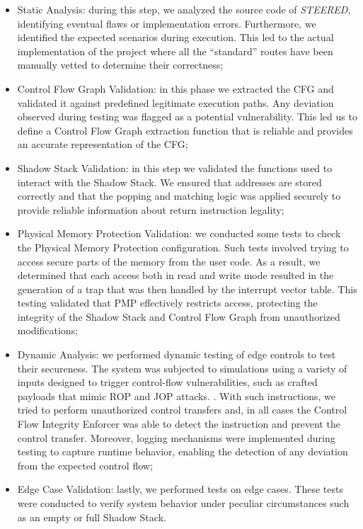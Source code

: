 \begin{itemize}
  \item Static Analysis: during this step, we analyzed the source code of \textit{STEERED},
    identifying eventual flaws or implementation errors. Furthermore, we identified
    the expected scenarios during execution. This led to the actual
    implementation of the project where all the ``standard'' routes have been
    manually vetted to determine their correctness;

  \item Control Flow Graph Validation: in this phase we extracted the CFG and
    validated it against predefined legitimate execution paths. Any deviation observed
    during testing was flagged as a potential vulnerability. This led us to
    define a Control Flow Graph extraction function that is reliable and
    provides an accurate representation of the CFG;

  \item Shadow Stack Validation: in this step we validated the functions used to
    interact with the Shadow Stack. We ensured that addresses are stored correctly
    and that the popping and matching logic was applied securely to provide reliable
    information about return instruction legality;

  \item Physical Memory Protection Validation: we conducted some tests to check
    the Physical Memory Protection configuration. Such tests involved trying to access
    secure parts of the memory from the user code. As a result, we determined that
    each access both in read and write mode resulted in the generation of a trap
    that was then handled by the interrupt vector table. This testing validated
    that PMP effectively restricts access, protecting the integrity of the Shadow
    Stack and Control Flow Graph from unauthorized modifications;

  \item Dynamic Analysis: we performed dynamic testing of edge controls to test
    their secureness. The system was subjected to simulations using a variety of
    inputs designed to trigger control-flow vulnerabilities, such as crafted
    payloads that mimic ROP and JOP attacks. . With such instructions, we tried
    to perform unauthorized control transfers and, in all cases the Control Flow
    Integrity Enforcer was able to detect the instruction and prevent the control
    transfer. Moreover, logging mechanisms were implemented during testing to capture
    runtime behavior, enabling the detection of any deviation from the expected
    control flow;

  \item Edge Case Validation: lastly, we performed tests on edge cases. These
    tests were conducted to verify system behavior under peculiar circumstances
    such as an empty or full Shadow Stack.
\end{itemize}

